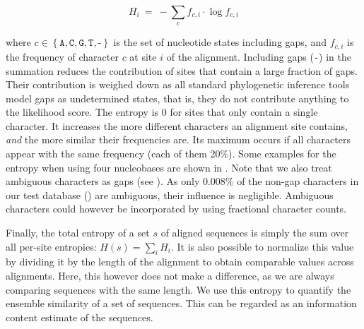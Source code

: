 \begin{equation}
    \label{ch:AutomaticTrees:eq:entropy}
    H_{i} ~=~ -\sum_c f_{c,i} \cdot \log f_{c,i}
\end{equation}

where $c \in \left\{ \texttt{A}, \texttt{C}, \texttt{G}, \texttt{T}, \texttt{-} \right\}$ is the set of nucleotide states
including gaps, and $ f_{c,i} $ is the frequency of character $c$ at site $i$ of the alignment.
Including gaps (\texttt{-}) in the summation reduces the contribution of sites that contain a large fraction of gaps.
Their contribution is weighed down as all standard phylogenetic inference tools model gaps as undetermined states,
that is, they do not contribute anything to the likelihood score.
The entropy is \num{0} for sites that only contain a single character.
It increases the more different characters an alignment site contains, {\em and} the more similar their frequencies are.
Its maximum occurs if all characters appear with the same frequency (each of them \num{20}\%).
Some examples for the entropy when using four nucleobases are shown in .
Note that we also treat ambiguous characters as gaps
(see ).
As only \num{0.008}\% of the non-gap characters in our test database () are ambiguous,
their influence is negligible.
Ambiguous characters could however be incorporated by using fractional character counts.

Finally, the total entropy of a set $s$ of aligned sequences is simply the sum over all per-site entropies:
$H(s) = \sum_i H_i$.
It is also possible to normalize this value by dividing it by the length of the alignment
to obtain comparable values across alignments.
Here, this however does not make a difference, as we are always comparing sequences with the same length.
We use this entropy to quantify the ensemble similarity of a set of sequences.
This can be regarded as an information content estimate of the sequences.


